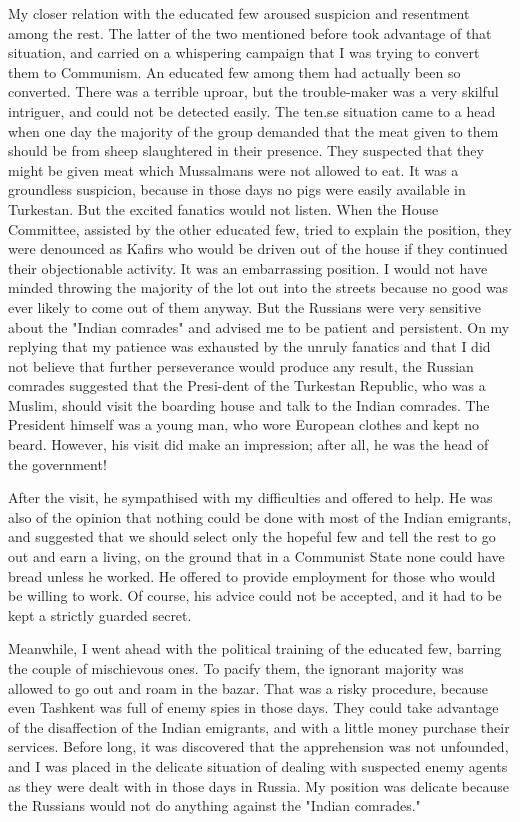 My closer relation with the educated few aroused suspicion and resentment among the rest. The latter of the two mentioned before took advantage of that situation, and carried on a whispering campaign that I was trying to convert them to Communism. An educated few among them had actually been so converted. There was a terrible uproar, but the trouble-maker was a very skilful intriguer, and could not be detected easily. The ten.se situation came to a head when one day the majority of the group demanded that the meat given to them should be from sheep slaughtered in their presence. They suspected that they might be given meat which Mussalmans were not allowed to eat. It was a groundless suspicion, because in those days no pigs were easily available in Turkestan. But the excited fanatics would not listen. When the House Committee, assisted by the other educated few, tried to explain the position, they were denounced as Kafirs who would be driven out of the house if they continued 
their objectionable activity. It was an embarrassing position. I would not have minded throwing the majority of the lot out into the streets because no good was ever likely to come out of them anyway. But the Russians were very sensitive about the "Indian comrades" and advised me to be patient and persistent. On my replying that my patience was exhausted by the unruly fanatics and that I did not believe that further perseverance would produce any result, the Russian comrades suggested that the Presi-dent of the Turkestan Republic, who was a Muslim, should visit the boarding house and talk to the Indian comrades. The President himself was a young man, who wore European clothes and kept no beard. 
However, his visit did make an impression; after all, he was the head of the government! 

After the visit, he sympathised with my difficulties and offered to help. He was also of the opinion that nothing could be done with most of the Indian emigrants, and suggested that we should select only the hopeful few and tell the rest to go out and earn a living, on the ground that in a Communist State none could have bread unless he worked. He offered to provide employment for those who would be willing to work. Of course, his advice could not be accepted, and it had to be kept a strictly guarded secret. 

Meanwhile, I went ahead with the political training of the educated few, barring the couple of mischievous ones. To pacify them, the ignorant majority was allowed to go out and roam in the bazar. That was a risky procedure, because even Tashkent was full of enemy spies in those days. They could take advantage of the disaffection of the Indian emigrants, and with a little money purchase their services. Before long, it was discovered that the apprehension was not unfounded, and I was placed in the delicate situation of dealing with suspected enemy agents as they were dealt with in those days in Russia. My position was delicate because the Russians would not do anything against the "Indian comrades." 


